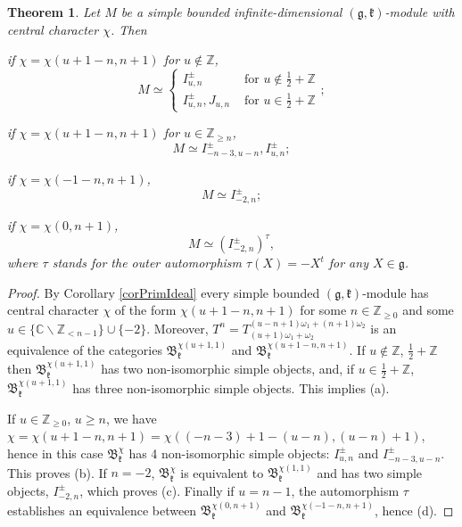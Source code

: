 \documentclass[12pt]{amsart}
\theoremstyle{plain} %
\newtheorem{theorem}[definition]{Theorem}
\newcommand {\ZZ} {\mathbb {Z}}
\newcommand {\CC} {\mathbb {C}}
\newcommand{\kk}{\mathfrak{k}}
\renewcommand{\gg}{\mathfrak{g}}
\newcommand {\BB} {\mathfrak {B}}
\newcommand{\doublebrace}[4]{\left\{\begin{array}{ll}#1 & #2 \\ #3 & #4\end{array}\right.}
\newcommand{\half}{\frac{1}{2}}
\newcommand{\refcor}[1]{Corollary \ref{#1}}
\begin{document}
\begin{theorem}\label{th914}
Let $M$ be a simple bounded infinite-dimensional $(\gg,\kk)$-module with central character $\chi$. Then
\item[(a)] if $\chi=\chi(u+1-n,n+1)$ for $u\notin\ZZ$,
\[
M\simeq\doublebrace{I^\pm_{u,n}}{\text{~for~}u\notin\half+\ZZ}{I^\pm_{u,n},J_{u,n}}{\text{~for~}u\in\half+\ZZ};
\]
\item[(b)] if $\chi=\chi(u+1-n,n+1)$ for $u\in\ZZ_{\geq n}$,
\[
M\simeq I^\pm_{-n-3,u-n},I^\pm_{u,n};
\]
\item[(c)] if $\chi=\chi(-1-n,n+1)$,
\[
M\simeq I^\pm_{-2,n};
\]
\item[(d)] if $\chi=\chi(0,n+1)$,
\[
M\simeq(I^\pm_{-2,n})^\tau,
\]
where $\tau$ stands for the outer automorphism $\tau(X)=-X^t$ for any 
$X\in\gg$.
\end{theorem}
\begin{proof}
By \refcor{corPrimIdeal} every simple bounded $(\gg,\kk)$-module has
central character $\chi$ of the form $\chi(u+1-n,n+1)$ for some
$n\in\ZZ_{\geq 0}$ and some $u\in\{\CC\backslash
\ZZ_{<n-1}\}\cup\{-2\}$. Moreover,
$T^n=T_{(u+1)\omega_1+\omega_2}^{(u-n+1)\omega_1+(n+1)\omega_2}$ is an
equivalence of the categories $\BB_\kk^{\chi(u+1,1)}$ and
$\BB_\kk^{\chi(u+1-n,n+1)}$. If $u\notin\ZZ$, $\half+\ZZ$ then
$\BB_\kk^{\chi(u+1,1)}$ has two non-isomorphic simple objects, and, if $u\in \half+\ZZ$, $\BB_\kk^{\chi(u+1,1)}$ has three non-isomorphic simple objects. This implies (a).

If $u\in\ZZ_{\geq 0}$, $u\geq n$, we have $\chi=\chi(u+1-n,n+1)=\chi((-n-3)+1-(u-n),(u-n)+1)$, hence in this case $\BB_\kk^\chi$ has 4 non-isomorphic simple objects: $I^\pm_{u,n}$ and $I^\pm_{-n-3,u-n}$. This proves (b). If $n=-2$, $\BB_\kk^\chi$ is equivalent to $\BB_\kk^{\chi(1,1)}$ and has two simple objects, $I^\pm_{-2,n}$, which proves (c). Finally if $u=n-1$, the automorphism $\tau$ establishes an equivalence between $\BB_\kk^{\chi(0,n+1)}$ and $\BB_\kk^{\chi(-1-n,n+1)}$, hence (d).
\end{proof}
\end{document}
